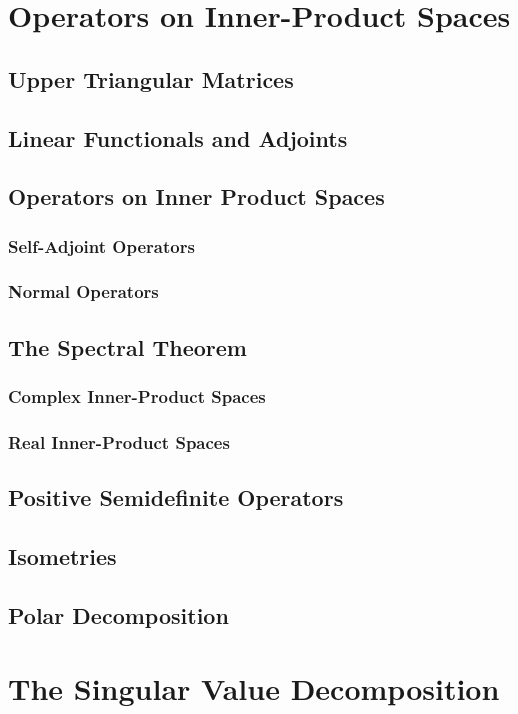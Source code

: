 \documentclass[10pt]{article}
\begin{document}
\section{Operators on Inner-Product Spaces}
\subsection{Upper Triangular Matrices}
\subsection{Linear Functionals and Adjoints}
\subsection{Operators on Inner Product Spaces}
\subsubsection{Self-Adjoint Operators}
\subsubsection{Normal Operators}
\subsection{The Spectral Theorem}
\subsubsection{Complex Inner-Product Spaces}
\subsubsection{Real Inner-Product Spaces}
\subsection{Positive Semidefinite Operators}
\subsection{Isometries}
\subsection{Polar Decomposition}

\section{The Singular Value Decomposition}
\end{document}
